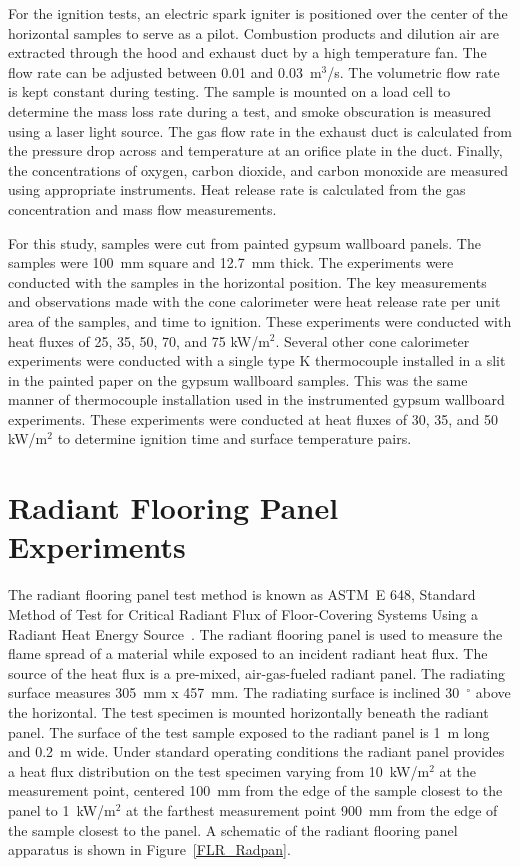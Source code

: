 \documentclass[twoside]{uocthesis}
\begin{document}
{For the ignition tests, an electric spark igniter is positioned over the center of the horizontal samples to serve as a pilot.  Combustion products and dilution air are extracted through the hood and exhaust duct by a high temperature fan. The flow rate can be adjusted between 0.01 and 0.03~m$^3$/s. The volumetric flow rate is kept constant during testing. The sample is mounted on a load cell to determine the mass loss rate during a test, and smoke obscuration is measured using a laser light source. The gas flow rate in the exhaust duct is calculated from the pressure drop across and temperature at an orifice plate in the duct. Finally, the concentrations of oxygen, carbon dioxide, and carbon monoxide are measured using appropriate instruments. Heat release rate is calculated from the gas concentration and mass flow measurements.

For this study, samples were cut from painted gypsum wallboard panels. The samples were 100~mm square and 12.7~mm thick. The experiments were conducted with the samples in the horizontal position.  The key measurements and observations made with the cone calorimeter were heat release rate per unit area of the samples, and time to ignition. These experiments were conducted with heat fluxes of 25, 35, 50, 70, and 75 kW/m$^2$. Several other cone calorimeter experiments were conducted with a single type K thermocouple installed in a slit in the painted paper on the gypsum wallboard samples.  This was the same manner of thermocouple installation used in the instrumented gypsum  wallboard experiments.  These experiments were conducted at heat fluxes of 30, 35, and 50 kW/m$^2$ to determine ignition time and surface temperature pairs.

\section{Radiant Flooring Panel Experiments}

The radiant flooring panel test method is known as ASTM~E 648, Standard Method of Test for Critical Radiant Flux of Floor-Covering Systems Using a Radiant Heat Energy Source~\cite{ASTM_E648}.  The radiant flooring panel is used to measure the flame spread of a material while exposed to an incident radiant heat flux. The source of the heat flux is a pre-mixed, air-gas-fueled radiant panel.  The radiating surface measures 305~mm x 457~mm. The radiating surface is inclined 30~$^{\circ}$ above the horizontal. The test specimen is mounted horizontally beneath the radiant panel.  The surface of the test sample exposed to the radiant panel is 1~m long and 0.2~m wide. Under standard operating conditions the radiant panel provides a heat flux distribution on the test specimen varying from 10~kW/m$^2$ at the measurement point, centered 100~mm from the edge of the sample closest to the panel to 1~kW/m$^2$ at the farthest measurement point 900~mm from the edge of the sample closest to the panel. A schematic of the radiant flooring panel apparatus is shown in Figure~\ref{FLR_Radpan}.  

}
\end{document}
